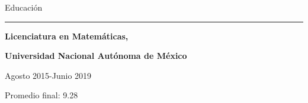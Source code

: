 \documentclass{article}
\begin{document}
\begin{minipage}[t]{0.60\textwidth}

\vspace{0.4cm}


{\large Educación}
\rule{\linewidth}{0.4pt}

\vspace{0.2cm}



\large \textbf{Licenciatura en Matemáticas,}


\large \textbf{Universidad Nacional Autónoma de México}

{\small Agosto 2015-Junio 2019}

{\small Promedio final: 9.28}




\end{minipage}
\end{document}

